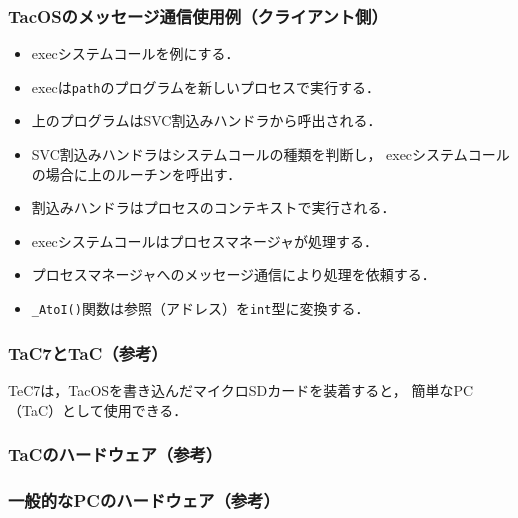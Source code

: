 \documentclass{beamer}                   %
\begin{document}
\begin{frame}
  \frametitle{TacOSのメッセージ通信使用例（クライアント側）}
  \begin{itemize}
  \item execシステムコールを例にする．
  \item execは{\tt path}のプログラムを新しいプロセスで実行する．
  \item 上のプログラムはSVC割込みハンドラから呼出される．
  \item SVC割込みハンドラはシステムコールの種類を判断し，
    execシステムコールの場合に上のルーチンを呼出す．
  \item 割込みハンドラはプロセスのコンテキストで実行される．
  \item execシステムコールはプロセスマネージャが処理する．
  \item プロセスマネージャへのメッセージ通信により処理を依頼する．
  \item {\tt \_AtoI()}関数は参照（アドレス）を{\tt int}型に変換する．
  \end{itemize}
\end{frame}

\begin{frame}
  \frametitle{TaC7とTaC（参考）}
  \begin{minipage}{0.58\columnwidth}
  \end{minipage}
  \begin{minipage}{0.38\columnwidth}
  \end{minipage}
\vfill
TeC7は，TacOSを書き込んだマイクロSDカードを装着すると，
簡単なPC（TaC）として使用できる．
\end{frame}

\begin{frame}
  \frametitle{TaCのハードウェア（参考）}
\end{frame}

\begin{frame}
  \frametitle{一般的なPCのハードウェア（参考）}
\end{frame}
\end{document}

